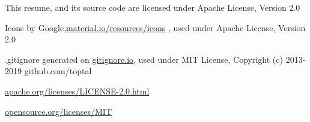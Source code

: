 \hspace{1pt}

\tiny{

	
This resume, and its source code are licensed under Apache License, Version 2.0

Icons by Google,{\secondaryColor\href{https://material.io/resources/icons}{material.io/resources/icons} }, used under Apache License, Version 2.0

.gitignore generated on {\secondaryColor\href{https://gitignore.io}{gitignore.io}}, used under MIT License, Copyright (c) 2013-2019 github.com/toptal

\secondaryColor\href{https://www.apache.org/licenses/LICENSE-2.0.html}{apache.org/licenses/LICENSE-2.0.html}

\secondaryColor\href{https://opensource.org/licenses/MIT}{opensource.org/licenses/MIT}


}